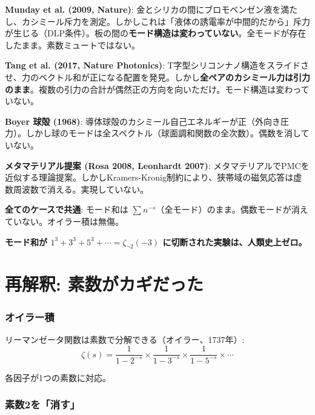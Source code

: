 \documentclass[12pt,a4paper]{article}
\begin{document}
\begin{honestbox}[なぜ既存の実験はBoyerの斥力ではないか]
\textbf{Munday et al. (2009, Nature)}: 金とシリカの間にブロモベンゼン液を満たし、カシミール斥力を測定。しかしこれは「液体の誘電率が中間的だから」斥力が生じる（DLP条件）。板の間の\textbf{モード構造は変わっていない}。全モードが存在したまま。素数ミュートではない。

\textbf{Tang et al. (2017, Nature Photonics)}: T字型シリコンナノ構造をスライドさせ、力のベクトル和が正になる配置を発見。しかし\textbf{全ペアのカシミール力は引力のまま}。複数の引力の合計が偶然正の方向を向いただけ。モード構造は変わっていない。

\textbf{Boyer 球殻 (1968)}: 導体球殻のカシミール自己エネルギーが正（外向き圧力）。しかし球のモードは全スペクトル（球面調和関数の全次数）。偶数を消していない。

\textbf{メタマテリアル提案 (Rosa 2008, Leonhardt 2007)}: メタマテリアルでPMCを近似する理論提案。しかしKramers-Kronig制約により、狭帯域の磁気応答は虚数周波数で消える。実現していない。

\textbf{全てのケースで共通}: モード和は $\sum n^{-s}$（全モード）のまま。偶数モードが消えていない。オイラー積は無傷。

\textbf{モード和が $1^3+3^3+5^3+\cdots = \zeta_{\neg 2}(-3)$ に切断された実験は、人類史上ゼロ。}
\end{honestbox}

\part{再解釈: 素数がカギだった}

\section{オイラー積}

\begin{mathbox}
リーマンゼータ関数は素数で分解できる（オイラー、1737年）:
$$\zeta(s) = \frac{1}{1-2^{-s}} \times \frac{1}{1-3^{-s}} \times \frac{1}{1-5^{-s}} \times \cdots$$

各因子が1つの素数に対応。
\end{mathbox}

\section{素数2を「消す」}
\end{document}
